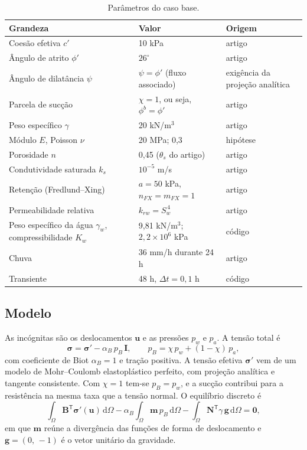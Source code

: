 \documentclass[11pt,a4paper]{article}
\numberwithin{equation}{section}
\begin{document}
\begin{table}[htbp]
\centering\footnotesize
\caption{Parâmetros do caso base.}\label{tab:parametros}
\begin{tabular}{p{6.2cm}p{5.0cm}p{3.6cm}}
\toprule
Grandeza & Valor & Origem \\
\midrule
Coesão efetiva $c'$ & 10 kPa & artigo \\
Ângulo de atrito $\phi'$ & $26^\circ$ & artigo \\
Ângulo de dilatância $\psi$ & $\psi = \phi'$ (fluxo associado) & exigência da projeção analítica \\
Parcela de sucção & $\chi = 1$, ou seja, $\phi^b = \phi'$ & artigo \\
Peso específico $\gamma$ & 20 kN/m$^3$ & artigo \\
Módulo $E$, Poisson $\nu$ & 20 MPa; 0,3 & hipótese \\
Porosidade $n$ & 0,45 ($\theta_s$ do artigo) & artigo \\
Condutividade saturada $k_s$ & $10^{-5}$ m/s & artigo \\
Retenção (Fredlund--Xing) & $a = 50$ kPa, $n_{FX} = m_{FX} = 1$ & artigo \\
Permeabilidade relativa & $k_{rw} = S_w^{\,4}$ & artigo \\
Peso específico da água $\gamma_w$, compressibilidade $K_w$ & 9,81 kN/m$^3$; $2{,}2\times10^{6}$ kPa & código \\
Chuva & 36 mm/h durante 24 h & artigo \\
Transiente & 48 h, $\Delta t = 0{,}1$ h & código \\
\bottomrule
\end{tabular}
\end{table}

\subsection{Modelo}

As incógnitas são os deslocamentos $\mathbf{u}$ e as pressões $p_w$ e $p_a$. A tensão total é
\begin{equation}
\boldsymbol\sigma = \boldsymbol\sigma' - \alpha_B\, p_B\,\mathbf{I}, \qquad p_B = \chi\, p_w + (1-\chi)\, p_a,
\end{equation}
com coeficiente de Biot $\alpha_B = 1$ e tração positiva. A tensão efetiva $\boldsymbol\sigma'$ vem de um modelo de Mohr--Coulomb
elastoplástico perfeito, com projeção analítica e tangente consistente. Com $\chi = 1$ tem-se $p_B = p_w$, e a sucção contribui
para a resistência na mesma taxa que a tensão normal. O equilíbrio discreto é
\begin{equation}\label{eq:equilibrio}
\int_\Omega \mathbf{B}^{\mathsf T}\boldsymbol\sigma'(\mathbf{u})\,\mathrm{d}\Omega
- \alpha_B \int_\Omega \mathbf{m}\, p_B\,\mathrm{d}\Omega
- \int_\Omega \mathbf{N}^{\mathsf T}\gamma\,\mathbf{g}\,\mathrm{d}\Omega = \mathbf{0},
\end{equation}
em que $\mathbf{m}$ reúne a divergência das funções de forma de deslocamento e $\mathbf{g} = (0,\,-1)$ é o vetor unitário da gravidade.
\end{document}

